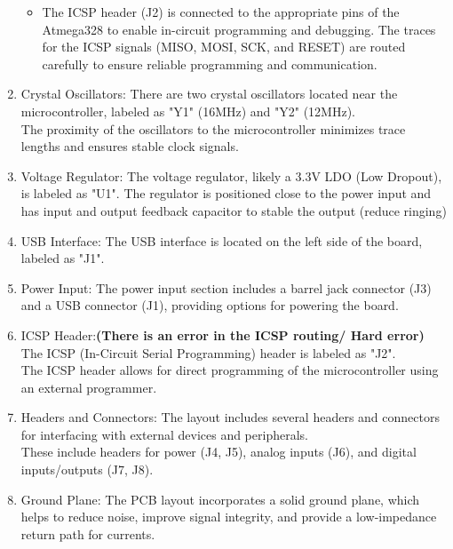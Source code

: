 \documentclass[a4paper,11pt]{article}%
\begin{document}
\begin{enumerate}
\begin{itemize}
		      \item The ICSP header (J2) is connected to the appropriate pins of the Atmega328 to enable in-circuit programming and debugging. The traces for the ICSP signals (MISO, MOSI, SCK, and RESET) are routed carefully to ensure reliable programming and communication.
	      \end{itemize}

	\item Crystal Oscillators:
	      There are two crystal oscillators located near the microcontroller, labeled as "Y1" (16MHz) and "Y2" (12MHz).\\
	      The proximity of the oscillators to the microcontroller minimizes trace lengths and ensures stable clock signals.
	\item Voltage Regulator:
	      The voltage regulator, likely a 3.3V LDO (Low Dropout), is labeled as "U1".
	      The regulator is positioned close to the power input and has input and output feedback capacitor to stable the output (reduce ringing)
	\item USB Interface:
	      The USB interface is located on the left side of the board, labeled as "J1".
	\item Power Input:
	      The power input section includes a barrel jack connector (J3) and a USB connector (J1), providing options for powering the board.
	\item ICSP Header:\textbf{(There is an error in the ICSP routing/ Hard error)}
	      The ICSP (In-Circuit Serial Programming) header is labeled as "J2".\\
	      The ICSP header allows for direct programming of the microcontroller using an external programmer.
	\item Headers and Connectors:
	      The layout includes several headers and connectors for interfacing with external devices and peripherals.\\
	      These include headers for power (J4, J5), analog inputs (J6), and digital inputs/outputs (J7, J8).
	\item Ground Plane:
	      The PCB layout incorporates a solid ground plane, which helps to reduce noise, improve signal integrity, and provide a low-impedance return path for currents.
\end{enumerate}
\end{document}
